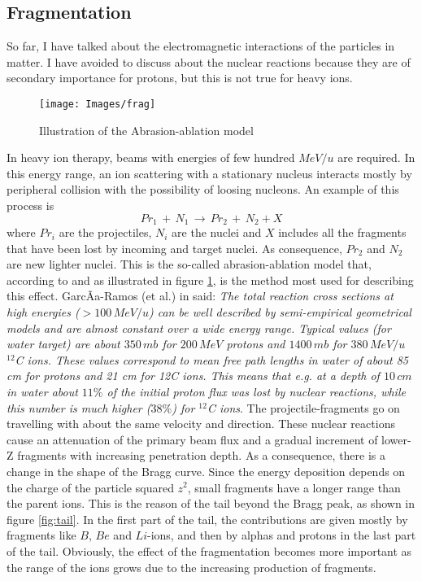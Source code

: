 \documentclass[12pt, a4paper, twoside]{book}
\begin{document}
\subsection{Fragmentation}
So far, I have talked about the electromagnetic interactions of the particles in matter. I have avoided to discuss about the nuclear reactions because they are of secondary importance for protons, but this is not true for heavy ions.
\begin{figure}[!t]
{\texttt{[image: Images/frag]}}
\caption{Illustration of the Abrasion-ablation model}
\label{fig:frag}
\end{figure}
In heavy ion therapy, beams with energies of few hundred $MeV/u$ are required. In this energy range, an ion scattering with a stationary nucleus interacts mostly by peripheral collision with the possibility of loosing nucleons.
An example of this process is
\[
Pr_1\,+\,N_1 \, \rightarrow\, Pr_2 \,+\, N_2 + X
\]
where $Pr_i$ are the projectiles, $N_i$ are the nuclei and $X$ includes all the fragments that have been lost by incoming and target nuclei. As consequence, $Pr_2$ and $N_2$ are new lighter nuclei.
This is the so-called abrasion-ablation model that, according to \cite{serb:nucRea} and as illustrated in figure \ref{fig:frag}, is the method most used for describing this effect.
GarcÃ­a-Ramos (et al.) in \cite{garc:nucu} said: \emph{The total reaction cross sections at high energies ($>100\,MeV/u$) can be well described by semi-empirical geometrical models and are almost constant over a wide energy range. Typical values (for water target) are about $350\, mb$ for $200\,MeV$ protons and $1400\,mb$ for $380\,MeV/u$ $^{12}$C ions. These values correspond to mean free path lengths in water of about 85 cm for protons and 21 cm for 12C ions. This means that e.g. at a depth of $10\,cm$ in water about $11\%$ of the initial proton flux was lost by nuclear reactions, while this number is much higher ($38\%$) for $^{12}$C ions}.
The projectile-fragments go on travelling with about the same velocity and direction. These nuclear reactions cause an attenuation of the primary beam flux and a gradual increment of lower-Z fragments with increasing penetration depth.
As a consequence, there is a change in the shape of the Bragg curve. Since the energy deposition depends on the charge of the particle squared $z^2$, small fragments have a longer range than the parent ions. This is the reason of the tail beyond the Bragg peak, as shown in figure \ref{fig:tail}. 
In the first part of the tail, the contributions are given mostly by fragments like $B$, $Be$ and $Li$-ions, and then by alphas and protons in the last part of the tail.
Obviously, the effect of the fragmentation becomes more important as the range of the ions grows due to the increasing production of fragments.
\end{document}
